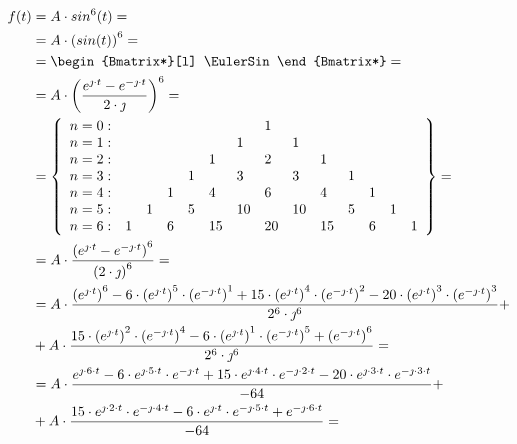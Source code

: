 \begin{task}
\begin{align*}
f(t)&=A\cdot sin^6(t)=\\
&=A\cdot \left( sin(t) \right)^6=\\
&=\begin{Bmatrix*}[l]
\EulerSin
\end{Bmatrix*}=\\
&=A\cdot\left(\frac{e^{\jmath \cdot t} - e^{-\jmath \cdot t}}{2 \cdot \jmath}\right)^6=\\
&=\left\{\begin{array}{llllllllllllll}
n=0: &   &   &   &   &   &   & 1 &   &   &   &   &   &   \\
n=1: &   &   &   &   &   & 1 &   & 1 &   &   &   &   &   \\
n=2: &   &   &   &   & 1 &   & 2 &   & 1 &   &   &   &   \\
n=3: &   &   &   & 1 &   & 3 &   & 3 &   & 1 &   &   &   \\
n=4: &   &   & 1 &   & 4 &   & 6 &   & 4 &   & 1 &   &   \\
n=5: &   & 1 &   & 5 &   & 10&   &10 &   & 5 &   & 1 &   \\
n=6: & 1 &   & 6 &   & 15&   & 20&   & 15&   & 6 &   & 1 
\end{array}\right\}=\\
&=A\cdot \frac{\left(e^{\jmath \cdot t} - e^{-\jmath \cdot t}\right)^6}{\left(2 \cdot \jmath\right)^6}=\\
&=A\cdot \frac{\left(e^{\jmath \cdot t}\right)^6 - 6 \cdot\left(e^{\jmath \cdot t}\right)^5 \cdot \left(e^{-\jmath \cdot t}\right)^1 + 15 \cdot\left(e^{\jmath \cdot t}\right)^4 \cdot \left(e^{-\jmath \cdot t}\right)^2 - 20 \cdot\left(e^{\jmath \cdot t}\right)^3 \cdot \left(e^{-\jmath \cdot t}\right)^3}{2^6 \cdot \jmath^6}+\\
&+A\cdot \frac{15 \cdot\left(e^{\jmath \cdot t}\right)^2 \cdot \left(e^{-\jmath \cdot t}\right)^4 - 6 \cdot\left(e^{\jmath \cdot t}\right)^1 \cdot \left(e^{-\jmath \cdot t}\right)^5 + \left(e^{-\jmath \cdot t}\right)^6}{2^6 \cdot \jmath^6}=\\
&=A\cdot \frac{e^{\jmath \cdot 6 \cdot t} - 6 \cdot e^{\jmath \cdot 5 \cdot t} \cdot e^{-\jmath \cdot t} + 15 \cdot e^{\jmath \cdot 4 \cdot t} \cdot e^{-\jmath \cdot 2 \cdot t} - 20 \cdot e^{\jmath \cdot 3 \cdot t} \cdot e^{-\jmath \cdot 3 \cdot t}}{-64}+\\
&+A\cdot \frac{15 \cdot e^{\jmath \cdot 2\cdot t} \cdot e^{-\jmath \cdot 4 \cdot t} - 6 \cdot e^{\jmath \cdot t} \cdot e^{-\jmath \cdot 5 \cdot t} + e^{-\jmath \cdot 6 \cdot t}}{-64}=\\

\end{align*}
\end{task}
